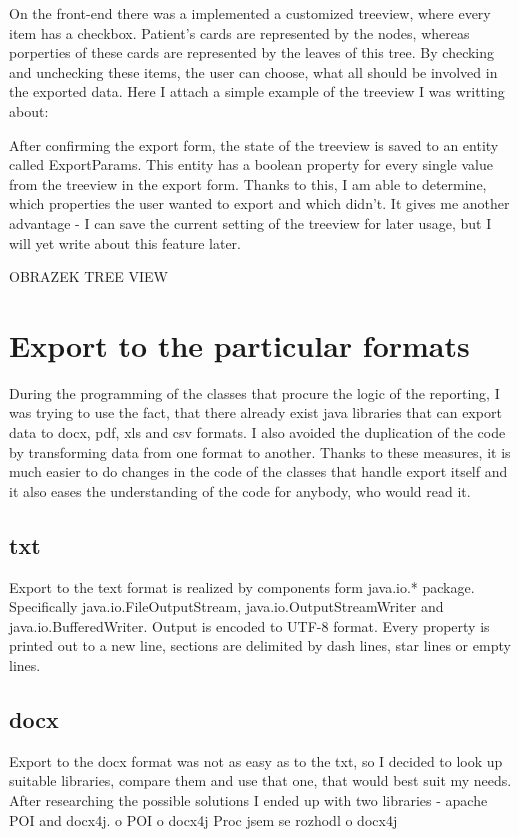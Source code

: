 \documentclass[thesis=B,english]{FITthesis}[2012/10/20]
\begin{document}
On the front-end there was a implemented a customized treeview, where every item has a checkbox. Patient's cards are represented by the nodes, whereas porperties of these cards are represented by the leaves of this tree. By checking and unchecking these items, the user can choose, what all should be involved in the exported data.
Here I attach a simple example of the treeview I was writting about:



After confirming the export form, the state of the treeview is saved to an entity called ExportParams. This entity has a boolean property for every single value from the treeview in the export form. Thanks to this, I am able to determine, which properties the user wanted to export and which didn't. It gives me another advantage - I can save the current setting of the treeview for later usage, but I will yet write about this feature later.
 
OBRAZEK TREE VIEW
\section{Export to the particular formats}
During the  programming of the classes that procure the logic of the reporting, I was trying to use the fact, that there already exist java libraries that can export data to docx, pdf, xls and csv formats. I also avoided the duplication of the code by transforming data from one format to another. Thanks to these measures, it is much easier to do changes in the code of the classes that handle export itself and it also eases the understanding of the code for anybody, who would read it.
\subsection{txt}
Export to the text format is realized by components form java.io.* package. Specifically java.io.FileOutputStream, java.io.OutputStreamWriter and java.io.BufferedWriter. Output is encoded to UTF-8 format. Every property is printed out to a new line, sections are delimited by dash lines, star lines or empty lines.
\subsection{docx}
Export to the docx format was not as easy as to the txt, so I decided to look up suitable libraries, compare them and use that one, that would best suit my needs. After researching the possible solutions I ended up with two libraries - apache POI and docx4j.
o POI
o docx4j
Proc jsem se rozhodl o docx4j
\end{document}
